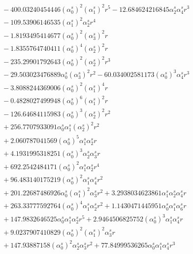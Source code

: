 \documentclass[10pt]{article}
\begin{document}
\begin{align*}
&{}  - 400.03240454446 \left(\alpha_{0}^s\right)^{2} \left(\alpha_{1}^s\right)^{2} r^{5} - 12.684624216845 \alpha_{2}^s \alpha_{4}^s r^{3} \\
&{}  - 109.53906146535 \left(\alpha_{1}^s\right)^{2} \alpha_{2}^s r^{4} \\
&{}  - 1.8193495414677 \left(\alpha_{0}^s\right)^{2} \left(\alpha_{3}^s\right)^{2} r \\
&{}  - 1.8355764740411 \left(\alpha_{0}^s\right)^{4} \left(\alpha_{2}^s\right)^{2} r \\
&{}  - 235.29901792643 \left(\alpha_{0}^s\right)^{2} \left(\alpha_{2}^s\right)^{2} r^{3} \\
&{}  - 29.503023476889 \alpha_{0}^s \left(\alpha_{3}^s\right)^{2} r^{2} - 60.034002581173 \left(\alpha_{0}^s\right)^{3} \alpha_{4}^s r^{3} \\
&{}  - 3.8088244369006 \left(\alpha_{0}^s\right)^{2} \left(\alpha_{1}^s\right)^{4} r \\
&{}  - 0.4828027499948 \left(\alpha_{0}^s\right)^{6} \left(\alpha_{1}^s\right)^{2} r \\
&{}  - 126.64684115983 \left(\alpha_{0}^s\right)^{3} \left(\alpha_{2}^s\right)^{2} r^{2} \\
&{}  + 256.7707933091 \alpha_{0}^s \alpha_{1}^s \left(\alpha_{2}^s\right)^{2} r^{2} \\
&{}  + 2.060787041569 \left(\alpha_{0}^s\right)^{5} \alpha_{1}^s \alpha_{2}^s r \\
&{}  + 4.1931995318251 \left(\alpha_{0}^s\right)^{3} \alpha_{2}^s \alpha_{3}^s r \\
&{}  + 692.2542484171 \left(\alpha_{0}^s\right)^{2} \alpha_{1}^s \alpha_{2}^s r^{4} \\
&{}  + 96.483140175219 \left(\alpha_{0}^s\right)^{2} \alpha_{1}^s \alpha_{4}^s r^{2} \\
&{}  + 201.22687486926 \alpha_{0}^s \left(\alpha_{1}^s\right)^{2} \alpha_{3}^s r^{2} + 3.2938034623861 \alpha_{1}^s \alpha_{2}^s \alpha_{4}^s r \\
&{}  + 263.33777592764 \left(\alpha_{0}^s\right)^{4} \alpha_{1}^s \alpha_{2}^s r^{2} + 1.1430471445951 \alpha_{0}^s \alpha_{1}^s \alpha_{6}^s r \\
&{}  + 147.9832646525 \alpha_{0}^s \alpha_{1}^s \alpha_{2}^s r^{5} + 2.9464506825752 \left(\alpha_{0}^s\right)^{3} \alpha_{1}^s \alpha_{4}^s r \\
&{}  + 9.0237907410829 \left(\alpha_{0}^s\right)^{2} \left(\alpha_{1}^s\right)^{2} \alpha_{3}^s r \\
&{}  + 147.93887158 \left(\alpha_{0}^s\right)^{2} \alpha_{2}^s \alpha_{3}^s r^{2} + 77.84999536265 \alpha_{0}^s \alpha_{1}^s \alpha_{4}^s r^{3} \\

\end{align*}
\end{document}
